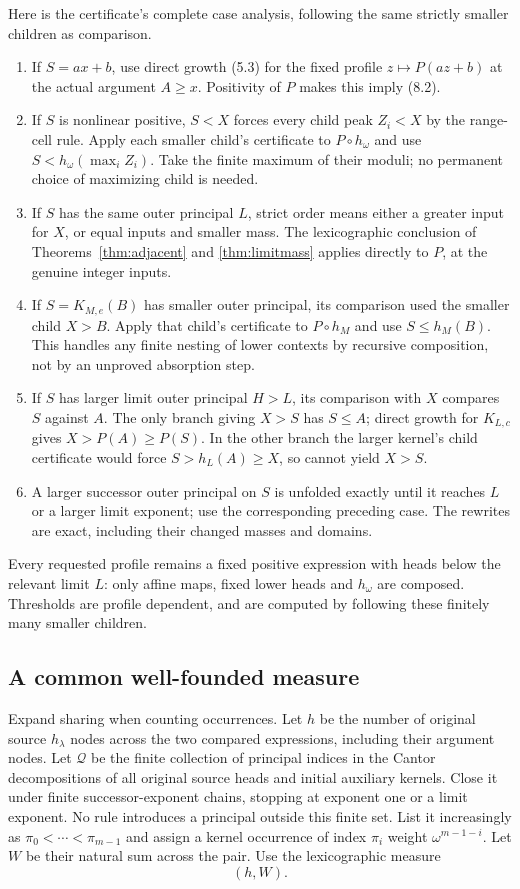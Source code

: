 \documentclass[11pt,a4paper]{article}
\newcommand{\KK}[2]{K_{#1,#2}}
\begin{document}
Here is the certificate's complete case analysis, following the same
strictly smaller children as comparison.
\begin{enumerate}
\item If $S=ax+b$, use direct growth (5.3) for the fixed profile
$z\mapsto P(az+b)$ at the actual argument $A\ge x$. Positivity of $P$
makes this imply (8.2).
\item If $S$ is nonlinear positive, $S<X$ forces every child peak $Z_i<X$
by the range-cell rule. Apply each smaller child's certificate to
$P\circ h_\omega$ and use $S<h_\omega(\max_i Z_i)$. Take the finite
maximum of their moduli; no permanent choice of maximizing child is needed.
\item If $S$ has the same outer principal $L$, strict order means either
a greater input for $X$, or equal inputs and smaller mass. The
lexicographic conclusion of Theorems~\ref{thm:adjacent} and
\ref{thm:limitmass} applies directly to $P$, at the genuine integer inputs.
\item If $S=\KK Me(B)$ has smaller outer principal, its comparison used
the smaller child $X>B$. Apply that child's certificate to
$P\circ h_M$ and use $S\le h_M(B)$. This handles any finite nesting of
lower contexts by recursive composition, not by an unproved absorption step.
\item If $S$ has larger limit outer principal $H>L$, its comparison with
$X$ compares $S$ against $A$. The only branch giving $X>S$ has $S\le A$;
direct growth for $\KK Lc$ gives $X>P(A)\ge P(S)$. In the other branch
the larger kernel's child certificate would force
$S>h_L(A)\ge X$, so cannot yield $X>S$.
\item A larger successor outer principal on $S$ is unfolded exactly until
it reaches $L$ or a larger limit exponent; use the corresponding preceding
case. The rewrites are exact, including their changed masses and domains.
\end{enumerate}
Every requested profile remains a fixed positive expression with heads
below the relevant limit $L$: only affine maps, fixed lower heads and
$h_\omega$ are composed. Thresholds are profile dependent, and are computed
by following these finitely many smaller children.

\subsection{A common well-founded measure}
Expand sharing when counting occurrences. Let $h$ be the number of
original source $h_\lambda$ nodes across the two compared expressions,
including their argument nodes. Let $\mathcal Q$ be the finite collection
of principal indices in the Cantor decompositions of all original source
heads and initial auxiliary kernels. Close it under finite successor-exponent
chains, stopping at exponent one or a limit exponent. No rule introduces
a principal outside this finite set. List it increasingly as
$\pi_0<\cdots<\pi_{m-1}$ and assign a kernel occurrence of index $\pi_i$
weight $\omega^{m-1-i}$. Let $W$ be their natural sum across the pair.
Use the lexicographic measure
\[
                             (h,W).                 \tag{8.3}
\]
\end{document}
